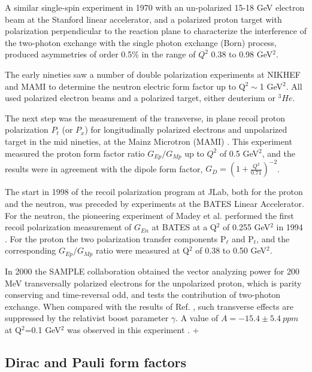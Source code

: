 A similar single-spin experiment in 1970 with an un-polarized 15-18 GeV electron beam at the Stanford linear accelerator,
 and a polarized proton target with polarization perpendicular to the reaction plane to characterize the interference of
 the two-photon exchange with the single photon exchange (Born) process, produced asymmetries of order 0.5\% in the
 range of $Q^2$ 0.38 to 0.98 GeV$^2$. 

The early nineties saw a number of double polarization experiments at NIKHEF \cite{passchier} and MAMI \cite{herberg,ostrick} to determine 
the neutron electric form factor up to 
Q$^2\sim $1 GeV$^2$. All used polarized electron beams and a polarized target, either deuterium or $^3He$.  

The next step was the measurement of the transverse, in plane recoil proton polarization $P_t$ (or $P_x$) for longitudinally 
polarized electrons and unpolarized target in the mid nineties, at the Mainz Microtron (MAMI) \cite{eyl:1995,pospischil}. 
This experiment measured the proton form factor ratio $G_{Ep}/G_{Mp}$ up to $Q^2$ of 0.5 GeV$^2$, and the results were in agreement 
with the dipole form factor, $G_D=(1+\frac{Q^2}{0.71})^{-2}$. 

The start in 1998 of the recoil polarization program at JLab, both for the proton and the neutron, was preceded by experiments at the BATES
 Linear Accelerator. For the neutron, the pioneering experiment of Madey et al. performed the first
 recoil polarization measurement of $G_{En}$ at BATES at a Q$^2$ of 0.255 GeV$^2$ in 1994 \cite{eden:1994}. 
 For the proton the two polarization transfer components P$_{\ell}$ and P$_t$, and the corresponding
 $G_{Ep}/G_{Mp}$ ratio were measured at Q$^2$ of 0.38 to 0.50 GeV$^2$\cite{barkhuff,milbrathA,milbrathB}. 

In 2000 the SAMPLE collaboration obtained the vector analyzing power for 200 MeV transversally polarized electrons for the unpolarized proton, 
which is parity conserving and 
time-reversal odd, and tests the contribution of two-photon exchange. When compared with the results of Ref. \cite{bizot}, such transverse effects 
are suppressed by the relativist boost parameter $\gamma$. A value of  $A=-15.4\pm 5.4 \ {ppm}$ at Q$^2$=0.1 GeV$^2$ was observed
in this experiment \cite{beise:2004}. 
+
\subsection{Dirac and Pauli form factors}

